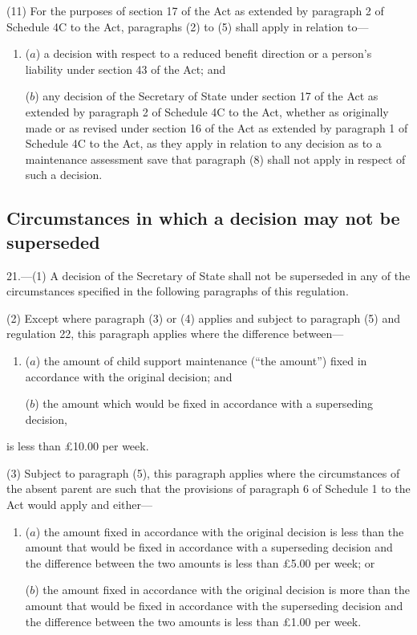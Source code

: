 \documentclass[a4paper,12pt]{article}
\begin{document}
(11) For the purposes of section 17 of the Act as extended by paragraph 2 of Schedule 4C to the Act, paragraphs (2) to (5) shall apply in relation to---
\begin{enumerate}\item[]
($a$) a decision with respect to a reduced benefit direction or a person’s liability under section 43 of the Act; and

($b$) any decision of the Secretary of State under section 17 of the Act as extended by paragraph 2 of Schedule 4C to the Act, whether as originally made or as revised under section 16 of the Act as extended by paragraph 1 of Schedule 4C to the Act, as they apply in relation to any decision as to a maintenance assessment save that paragraph (8) shall not apply in respect of such a decision.
\end{enumerate}


\subsection[21. Circumstances in which a decision may not be superseded]{Circumstances in which a decision may not be superseded}

21.—(1) A decision of the Secretary of State shall not be superseded in any of the circumstances specified in the following paragraphs of this regulation.

(2) Except where paragraph (3) or (4) applies and subject to paragraph (5) and regulation 22, this paragraph applies where the difference between---
\begin{enumerate}\item[]
\begin{sloppypar}
($a$) the amount of child support maintenance (“the amount”) fixed in accordance with the original decision; and
\end{sloppypar}

($b$) the amount which would be fixed in accordance with a superseding decision,
\end{enumerate}
is less than £10.00 per week.

(3) Subject to paragraph (5), this paragraph applies where the circumstances of the absent parent are such that the provisions of paragraph 6 of Schedule 1 to the Act would apply and either---
\begin{enumerate}\item[]
($a$) the amount fixed in accordance with the original decision is less than the amount that would be fixed in accordance with a superseding decision and the difference between the two amounts is less than £5.00 per week; or

($b$) the amount fixed in accordance with the original decision is more than the amount that would be fixed in accordance with the superseding decision and the difference between the two amounts is less than £1.00 per week.
\end{enumerate}
\end{document}
